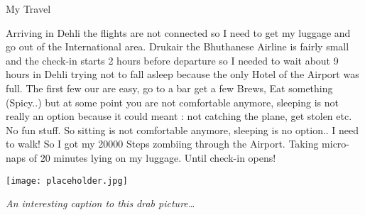 \documentclass[10pt,a4paper]{article} %
\newcommand{\NewsItem}[1]{ %
\usefont{T1}{fvs}{n}{n} %
\vspace{24pt}\large #1\vspace{3pt} %
\par \normalsize \normalfont}
\begin{document}
\begin{multicols}{3}

\NewsItem{My Travel}


Arriving in Dehli the flights are not connected so I need to get my luggage and go out of the International area. Drukair the Bhuthanese Airline is fairly small and the check-in starts 2 hours before departure so I needed to wait about 9 hours in Dehli trying not to fall asleep because the only Hotel of the Airport was full. The first few our are easy, go to a bar get a few Brews, Eat something (Spicy..) but at some point you are not comfortable anymore, sleeping is not really an option because it could meant : not catching the plane, get stolen etc. No fun stuff. So sitting is not comfortable anymore, sleeping is no option.. I need to walk! So I got my 20000 Steps zombiing through the Airport. Taking micro-naps of 20 minutes lying on my luggage. Until check-in opens! 



\end{multicols} %

\begin{center}
\vspace{10pt}
\texttt{[image: placeholder.jpg]} %
\par\large\textit{An interesting caption to this drab picture\ldots}
\vspace{10pt}
\end{center}
\end{document}
